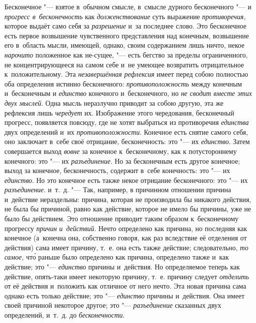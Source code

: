 
Бесконечное "--- взятое в~обычном смысле, в~смысле дурного бесконечного "--- и
{\em прогресс в~бесконечность} как {\em долженствование} суть выражение
{\em противоречия,} которое выдаёт само себя за
{\em разрешение} и~за последнее слово. Это бесконечное
есть первое возвышение чувственного представления над конечным, возвышение
его в~область мысли, имеющей, однако, своим содержанием лишь ничто, некое
{\em нарочито} положенное как не-сущее, "--- есть бегство
за пределы ограниченного, не концентрирующееся на самом себе и~не умеющее
возвратить отрицательное к~положительному. Эта
{\em незавершённая рефлексия} имеет перед собою
полностью оба определения истинно бесконечного:
{\em противоположность} между конечным и~бесконечным и
{\em единство} конечного и~бесконечного, но
{\em не сводит вместе этих двух мыслей}. Одна мысль
неразлучно приводит за собою другую, эта же рефлексия лишь
{\em чередует} их. Изображение этого чередования,
бесконечный прогресс, появляется повсюду, где не хотят выбраться из
противоречия {\em единства} двух определений и~их
{\em противоположности}. Конечное есть снятие самого
себя, оно заключает в~себе своё отрицание, бесконечность: это "--- их
{\em единство}. Затем совершается выход
{\em вовне} за конечное к~бесконечному, как к
потустороннему конечного: это "--- их {\em разъединение}.
Но за бесконечным есть другое конечное; выход за конечное, бесконечность,
содержит в~себе конечность: это "--- их {\em единство}. Но
это конечное есть также некое отрицание бесконечного: это "--- их
{\em разъединение}. и~т.~д. "--- Так, например, в
причинном отношении причина и~действие нераздельны: причина, которая не
производила бы никакого действия, не была бы причиной, равно как действие,
которое не имело бы причины, уже не было бы действием. Это отношение
приводит таким образом к~бесконечному прогрессу
{\em причин и~действий}. Нечто определено как причина,
но последняя как конечное (а~конечна она, собственно говоря, как раз
вследствие её отделения от действия) сама имеет причину, т.~е. она есть
также действие; следовательно, {\em то самое,} чт\'{о}
раньше было определено как причина, определено также и~как действие; это
"--- {\em единство} причины и~действия. Но определяемое
теперь как действие, опять-таки имеет некоторую причину, т.~е. причину
следует {\em отделить} от её действия и~положить как
отличное от него нечто. Эта новая причина сама однако есть только действие;
это "--- {\em единство} причины и~действия. Она имеет
своей причиной некоторое другое; это
"--- {\em разъединение} сказанных двух определений,
и~т.~д. до {\em бесконечности}.

